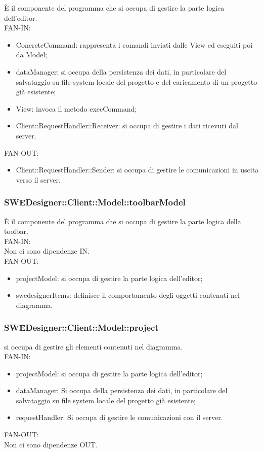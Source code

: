 \documentclass[../DefinizioneDiProdotto.tex]{subfiles}
\begin{document}
				È il componente del programma che si occupa di gestire la parte logica dell’editor.\\
					FAN-IN:
					\begin{itemize}
						\item ConcreteCommand: rappresenta i comandi inviati dalle View ed eseguiti poi da Model;
						\item dataManager: si occupa della persistenza dei dati, in particolare del salvataggio su file system locale del progetto e del caricamento di un progetto già esistente;
						\item View: invoca il metodo execCommand;
						\item Client::RequestHandler::Receiver: si occupa di gestire i dati ricevuti dal server.
					\end{itemize}
					FAN-OUT:
					\begin{itemize}
						\item Client::RequestHandler::Sender: si occupa di gestire le comunicazioni in uscita verso il server.
					\end{itemize}

				\subsubsection{SWEDesigner::Client::Model::toolbarModel}
				È il componente del programma che si occupa di gestire la parte logica della toolbar.\\
					FAN-IN:\\
					Non ci sono dipendenze IN. \\
					FAN-OUT:
					\begin{itemize}
						\item projectModel: si occupa di gestire la parte logica dell'editor;
						\item swedesignerItems: definisce il comportamento degli oggetti contenuti nel diagramma.
					\end{itemize}

				\subsubsection{SWEDesigner::Client::Model::project}
				si occupa di gestire gli elementi contenuti nel diagramma.\\
					FAN-IN:
					\begin{itemize}
						\item projectModel: si occupa di gestire la parte logica dell'editor;
						\item dataManager: Si occupa della persistenza dei dati, in particolare del salvataggio su file system locale del progetto già esistente;
						\item requestHandler: Si occupa di gestire le comunicazioni con il server.
					\end{itemize}
					FAN-OUT:\\
					Non ci sono dipendenze OUT. \\
				
\end{document}
